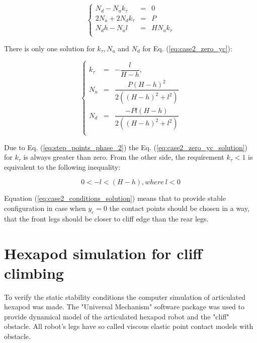 \documentclass{ws-procs9x6}
\begin{document}
\begin{equation}
\label{eq:case2_zero_yc}
\left\{
\begin{array}{lcl}
  N_d - N_uk_\tau &=& 0 \\
  2N_u+2N_dk_\tau &=& P \\
  N_dh - N_ul &=& HN_uk_\tau\\
\end{array}
\right.
\end{equation}

There is only one solution for $k_\tau, N_u$ and $N_d$ for Eq. (\ref{eq:case2_zero_yc}):

\begin{equation}
\label{eq:case2_zero_yc_solution}
\left\{
\begin{array}{lcl}
  k_\tau &=& -\dfrac{l}{H-h},\\
  N_u &=& \dfrac{P(H-h)^2}{2((H-h)^2+l^2)}\\
  N_d &=& \dfrac{-Pl(H - h)}{2((H-h)^2+l^2)}\\
\end{array}
\right.
\end{equation}

Due to Eq. (\ref{eq:step_points_phase_2}) the Eq. (\ref{eq:case2_zero_yc_solution}) for $k_\tau$ is always greater than zero. From the other side, the requirement $k_\tau<1$ is equivalent to the following inequality:

\begin{equation}
\label{eq:case2_conditions_solution}
  0<-l<(H-h),where~l<0
\end{equation}

Equation (\ref{eq:case2_conditions_solution}) means that to provide stable configuration in case when $y_c=0$ the contact points should be chosen in a way, that the front legs should be closer to cliff edge than the rear legs.


\section{Hexapod simulation for cliff climbing}
To verify the static stability conditions the computer simulation of articulated hexapod was made.  The "Universal Mechanism"\cite{um} software package was used to provide dynamical model of the articulated hexapod robot and the "cliff" obstacle. All robot's legs have so called viscous elastic point contact models with obstacle.
\end{document}
